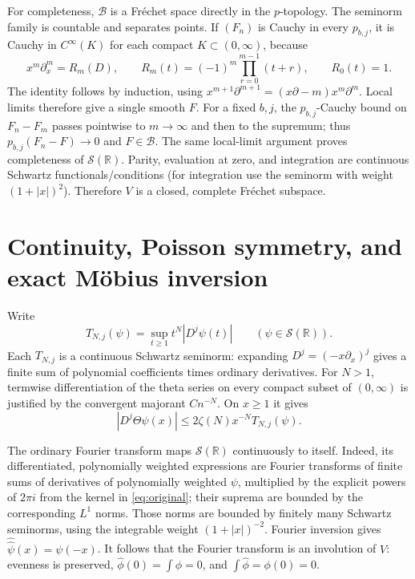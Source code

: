 \documentclass[11pt]{article}
\newcommand{\B}{\mathscr B}
\newcommand{\Sch}{\mathcal S}
\newcommand{\R}{\mathbb R}
\begin{document}
For completeness, $\B$ is a Fr\'echet space directly in the $p$-topology.
The seminorm family is countable and separates points. If $(F_n)$ is
Cauchy in every $p_{b,j}$, it is Cauchy in $C^\infty(K)$ for each compact
$K\subset(0,\infty)$, because
\begin{equation}\label{eq:R}
 x^m\partial_x^m=R_m(D),\qquad
 R_m(t)=(-1)^m\prod_{r=0}^{m-1}(t+r),\qquad R_0(t)=1.
\end{equation}
The identity follows by induction, using
$x^{m+1}\partial^{m+1}=(x\partial-m)x^m\partial^m$.
Local limits therefore give a single smooth $F$. For a fixed $b,j$,
the $p_{b,j}$-Cauchy bound on $F_n-F_m$ passes pointwise to $m\to\infty$
and then to the supremum; thus $p_{b,j}(F_n-F)\to0$ and $F\in\B$.
The same local-limit argument proves completeness of $\Sch(\R)$.
Parity, evaluation at zero, and integration are continuous Schwartz
functionals/conditions (for integration use the seminorm with weight
$(1+|x|)^2$). Therefore $V$ is a closed, complete Fr\'echet subspace.

\section{Continuity, Poisson symmetry, and exact M\"obius inversion}

Write
\[
 T_{N,j}(\psi)=\sup_{t\geq1}t^N|D^j\psi(t)|
 \qquad(\psi\in\Sch(\R)).
\]
Each $T_{N,j}$ is a continuous Schwartz seminorm: expanding
$D^j=(-x\partial_x)^j$ gives a finite sum of polynomial coefficients
times ordinary derivatives. For $N>1$, termwise differentiation of
the theta series on every compact subset of $(0,\infty)$ is justified
by the convergent majorant $C n^{-N}$. On $x\geq1$ it gives
\begin{equation}\label{eq:theta-tail}
 |D^j\Theta\psi(x)|\leq2\zeta(N)x^{-N}T_{N,j}(\psi).
\end{equation}

The ordinary Fourier transform maps $\Sch(\R)$ continuously to itself.
Indeed, its differentiated, polynomially weighted expressions are
Fourier transforms of finite sums of derivatives of polynomially
weighted $\psi$, multiplied by the explicit powers of $2\pi i$ from
the kernel in \eqref{eq:original}; their suprema are bounded by the
corresponding $L^1$ norms. Those norms are bounded by finitely many
Schwartz seminorms, using the integrable weight $(1+|x|)^{-2}$.
Fourier inversion gives $\widehat{\widehat\psi}(x)=\psi(-x)$.
It follows that the Fourier transform is an involution of $V$:
evenness is preserved, $\widehat\phi(0)=\int\phi=0$, and
$\int\widehat\phi=\phi(0)=0$.
\end{document}
